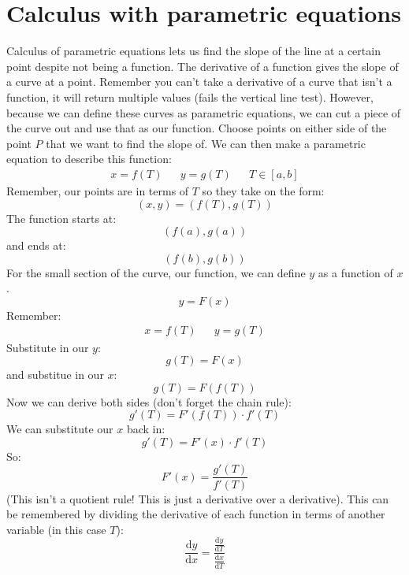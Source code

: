 \documentclass{report}
\begin{document}
\section{Calculus with parametric equations}
    Calculus of parametric equations lets us find the slope of the line at a certain point despite not being a function.
    The derivative of a function gives the slope of a curve at a point.
    Remember you can't take a derivative of a curve that isn't a function, it will return multiple values (fails the vertical line test).
    However, because we can define these curves as parametric equations, we can cut a piece of the curve out and use that as our function.
    Choose points on either side of the point \(P\) that we want to find the slope of. 
    We can then make a parametric equation to describe this function:
    \begin{align*}
        x = f(T) &&
        y = g(T) &&
        T \in  [a, b]
    \end{align*}
    Remember, our points are in terms of \(T\) so they take on the form:
    \[(x, y) = (f(T), g(T))\]
    The function starts at:
    \[(f(a), g(a))\]
    and ends at:
    \[(f(b), g(b))\]
    For the small section of the curve, our function, we can define \(y\) as a function of \(x\).
    \[y = F(x)\]
    Remember:
    \begin{align*}
        x = f(T) &&
        y = g(T)
    \end{align*}
    Substitute in our \(y\):
    \[g(T) = F(x)\]
    and substitue in our \(x\):
    \[g(T) = F(f(T))\]
    Now we can derive both sides (don't forget the chain rule):
    \[g'(T) = F'(f(T)) \cdot f'(T)\]
    We can substitute our \(x\) back in:
    \[g'(T) = F'(x) \cdot f'(T)\]
    So:
    \[F'(x) = \frac{g'(T)}{f'(T)}\]
    (This isn't a quotient rule! This is just a derivative over a derivative).
    This can be remembered by dividing the derivative of each function in terms of another variable (in this case \(T\)):
    \[\frac{\mathrm{d}y}{\mathrm{d}x} = \frac{\frac{\mathrm{d}y}{\mathrm{d}T}}{\frac{\mathrm{d}x}{\mathrm{d}T}}\]
    
\end{document}
